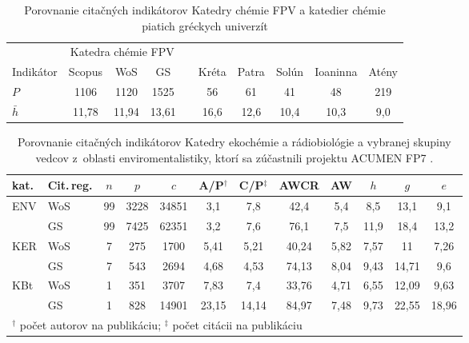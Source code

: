 \begin{table}
  \centering\small
  \caption[Porovnanie KCh FPV a chemických katedier vybraných gréckych univerzít]%
  {Porovnanie citačných indikátorov Katedry chémie FPV  a katedier chémie
    piatich gréckych univerzít \citep{Lazaridis2010}}
  \label{tab:lazaridis.results}
  \begin{tabularx}{\textwidth}{Xccclccccc}
    \toprule\noalign{\vspace{.5ex}}
    & \multicolumn{3}{c}{Katedra chémie FPV}& \phantom{M} & \multicolumn{5}{c}{\citet{Lazaridis2010}} \\
    Indikátor  & Scopus & WoS   & GS                 &  & Kréta & Patra & Solún & Ioaninna & Atény \\[0.3ex]
    \midrule\noalign{\vspace{.5ex}}
    $P$         & 1106   & 1120  & 1525               & & 56    & 61    & 41    & 48       & 219   \\
    $\bar{h}$  & 11,78  & 11,94 & 13,61              & & 16,6  & 12,6  & 10,4  & 10,3     & 9,0   \\[0.5ex]
    \bottomrule
  \end{tabularx}
\end{table}

\begin{table}
  \centering\small
  \caption[Porovnanie KEB, KBt a vybranej skupiny enviromentalistov]%
  {Porovnanie citačných indikátorov Katedry ekochémie a rádiobiológie a vybranej
    skupiny vedcov z~oblasti enviromentalistiky, ktorí sa zúčastnili projektu
    ACUMEN FP7 \citep{Wildgaard2015}.}
  \label{tab:wildgaard.results}
  \begin{tabularx}{\textwidth}{Xlcccccccccc}
    \toprule\noalign{\vspace{.3ex}}
    kat. &Cit.\,reg. & $n$ & $p$ & $c$ & A/P$^\dagger$ & C/P$^\ddagger$ & AWCR & AW & $h$ & $g$ & $e$ \\[0.3ex]
    \midrule\noalign{\vspace{.5ex}}
    ENV & WoS & 99 & 3228 & 34851 & 3,1   & 7,8   & 42,4  & 5,4  & 8,5  & 13,1  & 9,1   \\
        & GS  & 99 & 7425 & 62351 & 3,2   & 7,6   & 76,1  & 7,5  & 11,9 & 18,4  & 13,2  \\[2ex]
    KER & WoS & 7  & 275  & 1700  & 5,41  & 5,21  & 40,24 & 5,82 & 7,57 & 11    & 7,26  \\
        & GS  & 7  & 543  & 2694  & 4,68  & 4,53  & 74,13 & 8,04 & 9,43 & 14,71 & 9,6   \\[2ex]
    KBt & WoS & 1  & 351  & 3707  & 7,83  & 7,4   & 33,76 & 4,71 & 6,55 & 12,09 & 9,63  \\
        & GS  & 1  & 828  & 14901 & 23,15 & 14,14 & 84,97 & 7,48 & 9,73 & 22,55 & 18,96 \\[0.5ex]
    \bottomrule

    \multicolumn{12}{l}{\footnotesize $^\dagger$ počet autorov na publikáciu; $^\ddagger$ počet citácii na publikáciu} \\
  \end{tabularx}
\end{table}

